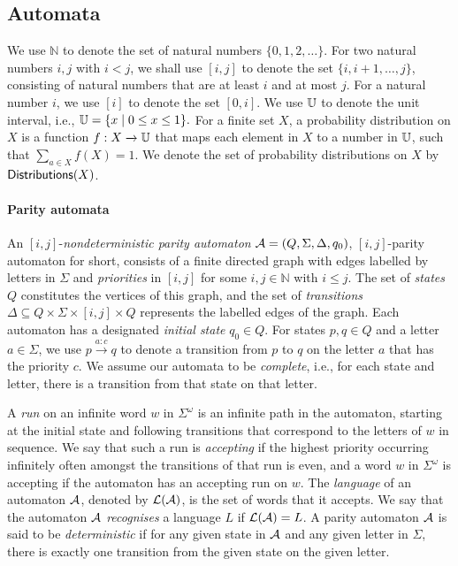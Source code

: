 \subsection{Automata}
We use $\mathbb{N}$ to denote the set of natural numbers $\{0,1,2,\dots\}$. For two natural numbers $i,j$ with $i<j$, we shall use $[i,j]$ to denote the set $\{i,i+1,\dots,j\}$, consisting of natural numbers that are at least $i$ and at most $j$. For a natural number $i$,  we use $[i]$ to denote the set $[0,i]$. 
We use $\mathbb{U}$ to denote the unit interval, i.e., $\mathbb{U} = \{x \mid 0 \leq x \leq 1\}.$
For a finite set $X$, a probability distribution on $X$ is a function $f:X\xrightarrow{}\mathbb{U}$ that maps each element in $X$ to a number in $\mathbb{U}$, such that $\sum_{a\in X} f(X) = 1$. We denote the set of probability distributions on $X$ by ${\mathsf{Distributions}}(X)$. 

\paragraph*{Parity automata}
An $[i,j]$-\emph{nondeterministic parity automaton} $\mathcal{A} = (Q,\Sigma,\Delta,q_0)$, $[i,j]$-parity automaton for short, consists of a finite directed graph with edges labelled by letters in $\Sigma$ and \emph{priorities} in $[i,j]$ for some $i,j \in \mathbb{N}$ with $i\leq j$. 
The set of \emph{states} $Q$ constitutes the vertices of this graph, and the set of \emph{transitions} $\Delta \subseteq Q \times \Sigma \times [i,j] \times Q$ represents the labelled edges of the graph. 
Each automaton has a designated \emph{initial state} $q_0 \in Q$. 
For states $p,q \in Q$ and a letter $a \in \Sigma$, we use $p\xrightarrow{a:c}q$ to denote a transition from $p$ to $q$ on the letter $a$ that has the priority $c$. We assume our automata to be \emph{complete}, i.e., for each state and letter, there is a transition from that state on that letter.

A \emph{run} on an infinite word $w$ in $\Sigma^{\omega}$ is an infinite path in the automaton, starting at the initial state and following transitions that correspond to the letters of $w$ in sequence.  We say that such a run is \emph{accepting} if the highest priority occurring infinitely often amongst the transitions of that run is even, and a word $w$ in $\Sigma^{\omega}$ is accepting if the automaton has an accepting run on $w$. The \emph{language} of an automaton $\mathcal{A}$, denoted by $\mathcal{L}(\mathcal{A})$, is the set of words that it accepts. We say that the automaton $\mathcal{A}$ \emph{recognises} a language $L$ if $\mathcal{L}(\mathcal{A})=L$. A parity automaton $\mathcal{A}$ is said to be \emph{deterministic} if for any given state in $\mathcal{A}$ and any given letter in $\Sigma$, there is exactly one transition from the given state on the given letter. 



